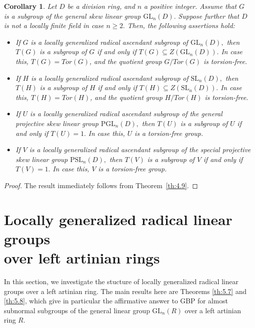 \documentclass{amsart}
\newtheorem{corollary}[theorem]{Corollary}
\theoremstyle{definition}
\begin{document}
\begin{corollary}\label{cor:4.10} Let $D$ be a division ring, and $n$ a positive integer. Assume that $G$ is a subgroup of the general skew linear group $\mathrm{GL}_n(D).$ Suppose further that  $D$ is not a locally finite field in case $n\geq 2.$ Then, the following assertions hold:
	\begin{itemize}
		\item [(1)] If $G$ is a locally generalized radical ascendant subgroup of $\mathrm{GL}_n(D),$ then $T(G)$ is a subgroup of $G$ if and only if $T(G)\subseteq Z(\mathrm{GL}_n(D)).$ In case this, $T(G)=\mathit{Tor}(G)$, and the quotient group $G/\mathit{Tor}(G)$ is torsion-free.	
		\item [(2)] If $H$ is a locally generalized radical ascendant subgroup of $\mathrm{SL}_n(D),$ then $T(H)$ is a subgroup of $H$ if and only if $T(H)\subseteq Z(\mathrm{SL}_n(D)).$ In case this, $T(H)=\mathit{Tor}(H)$, and the quotient group $H/\mathit{Tor}(H)$ is torsion-free.
		\item [(3)] If $U$ is a locally generalized radical ascendant subgroup of the general projective skew linear group $\mathrm{PGL}_n(D),$ then $T(U)$ is a subgroup of $U$ if and only if $T(U)=1.$ In case this, $U$ is a torsion-free group.
		\item [(4)] If $V$ is a locally generalized radical ascendant subgroup of the  special projective skew linear group $\mathrm{PSL}_n(D),$ then $T(V)$ is a subgroup of $V$ if and only if $T(V)=1.$ In case this, $V$ is a torsion-free group.
	\end{itemize}
\end{corollary}
\begin{proof} The result immediately follows from Theorem~\ref{th:4.9}. 
\end{proof}

\section{Locally generalized radical linear groups\\ over left artinian rings}\label{S5}

In this section, we investigate the stucture of locally generalized radical linear groups over a left artinian ring. The main results here are Theorems \ref{th:5.7} and \ref{th:5.8}, which give in particular the affirmative answer to GBP for almost subnormal subgroups of the general linear group $\mathrm{GL}_n(R)$ over a left artinian ring $R.$
\end{document}
